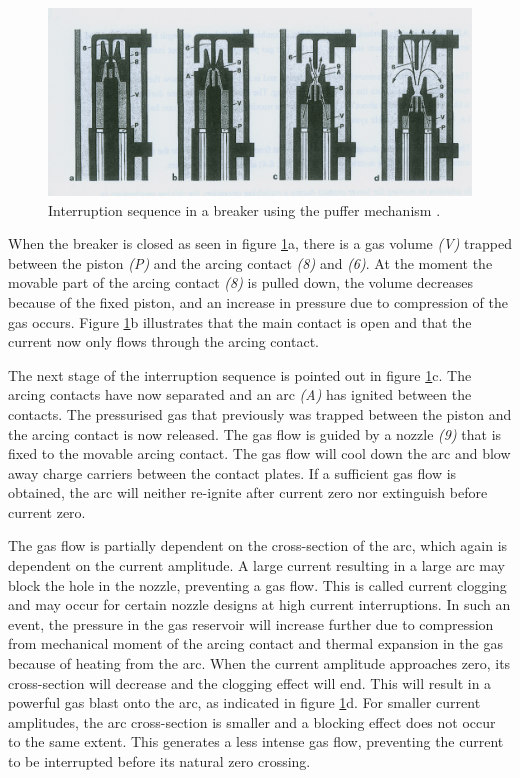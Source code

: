 \documentclass[10pt,a4paper,twoside]{article}
\begin{document}
\begin{figure} [H]
\centering
\includegraphics[scale=0.9]{Bilder/Theory/CircutBreakPuff1.png}
\caption{Interruption sequence in a breaker using the puffer mechanism \cite{bib:HVEbreak}.} \label{fig:CircutBreakPuff1}
\end{figure}

When the breaker is closed as seen in figure \ref{fig:CircutBreakPuff1}a, there is a gas volume \textit{(V)} trapped between the piston \textit{(P)} and the arcing contact \textit{(8)} and \textit{(6)}. At the moment the movable part of the arcing contact \textit{(8)} is pulled down, the volume decreases because of the fixed piston, and an increase in pressure due to compression of the gas occurs. Figure \ref{fig:CircutBreakPuff1}b illustrates that the main contact is open and that the current now only flows through the arcing contact.

The next stage of the interruption sequence is pointed out in figure \ref{fig:CircutBreakPuff1}c. The arcing contacts have now separated and an arc \textit{(A)} has ignited between the contacts. The pressurised gas that previously was trapped between the piston and the arcing contact is now released. The gas flow is guided by a nozzle \textit{(9)} that is fixed to the movable arcing contact. The gas flow will cool down the arc and blow away charge carriers between the contact plates. If a sufficient gas flow is obtained, the arc will neither re-ignite after current zero nor extinguish before current zero.

The gas flow is partially dependent on the cross-section of the arc, which again is dependent on the current amplitude. A large current resulting in a large arc may block the hole in the nozzle, preventing a gas flow. This is called current clogging and may occur for certain nozzle designs at high current interruptions. In such an event, the pressure in the gas reservoir will increase further due to compression from mechanical moment of the arcing contact and thermal expansion in the gas because of heating from the arc. When the current amplitude approaches zero, its cross-section will decrease and the clogging effect will end. This will result in a powerful gas blast onto the arc, as indicated in figure \ref{fig:CircutBreakPuff1}d. For smaller current amplitudes, the arc cross-section is smaller and a blocking effect does not occur to the same extent. This generates a less intense gas flow, preventing the current to be interrupted before its natural zero crossing.
 
\end{document}
